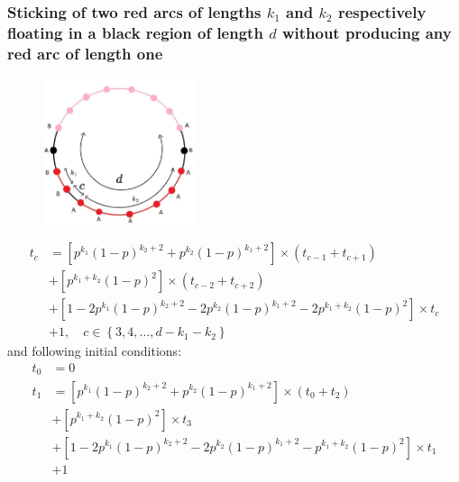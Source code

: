 \documentclass[]{book}
\theoremstyle{definition}
\begin{document}
\subsubsection{Sticking of two red arcs of lengths $k_1$ and $k_2$ respectively floating in a black region of length $d$ without producing any red arc of length one }
\begin{figure}[H]
    \centering\includegraphics[width=0.4\textwidth]{figures/arcs sticking.jpg}
    \caption{}
\end{figure}

\begin{equation}
\begin{split}
    t_c &= \left[p^{k_1}\left( 1-p \right)^{k_2+2} + p^{k_2}\left( 1-p \right)^{k_1+2} \right] \times \left( t_{c-1} + t_{c+1} \right) \\
    &+ \left[ p^{k_1+k_2}\left( 1-p \right)^2 \right] \times \left( t_{c-2}+t_{c+2} \right) \\
    &+ \left[ 1 - 2p^{k_1}\left( 1-p \right)^{k_2+2} - 2p^{k_2}\left( 1-p \right)^{k_1+2} - 2p^{k_1+k_2}\left( 1-p \right)^2 \right] \times t_c \\
    &+ 1, \quad c \in \left\{ 3, 4, \hdots, d - k_1 - k_2 \right\}
\end{split}
\end{equation}
and following initial conditions:
\begin{equation}
\begin{split}
    t_0 &= 0 \\
    t_1 &= \left[p^{k_1}\left( 1-p \right)^{k_2+2} + p^{k_2}\left( 1-p \right)^{k_1+2} \right] \times \left( t_0 + t_2 \right) \\
    &+ \left[ p^{k_1+k_2}\left( 1-p \right)^2 \right] \times t_3 \\
    &+ \left[ 1 - 2p^{k_1}\left( 1-p \right)^{k_2+2} - 2p^{k_2}\left( 1-p \right)^{k_1+2} - p^{k_1+k_2}\left( 1-p \right)^2 \right] \times t_1 \\
    &+ 1
\end{split}
\end{equation}
\end{document}
